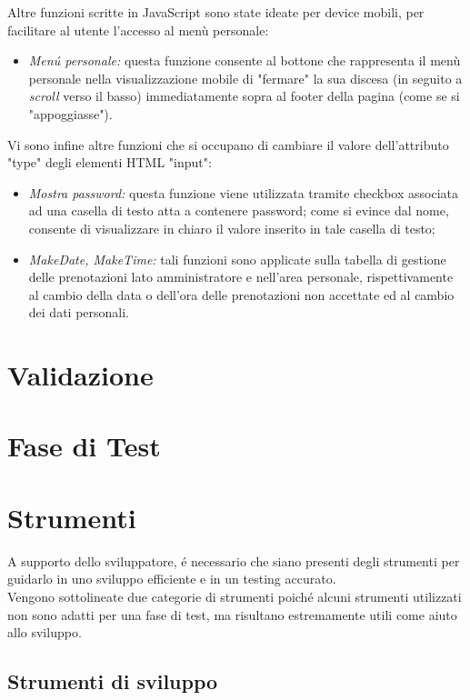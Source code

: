 \documentclass[]{article}
\begin{document}
Altre funzioni scritte in JavaScript sono state ideate per device mobili, per facilitare al utente l'accesso al menù personale:
\begin{itemize}
        \item \textit{Menú personale:} questa funzione consente al bottone che rappresenta il menù personale nella visualizzazione mobile di "fermare" la sua discesa (in seguito a \textit{scroll} verso il basso) immediatamente sopra al footer della pagina (come se si "appoggiasse").
\end{itemize}
Vi sono infine altre funzioni che si occupano di cambiare il valore dell'attributo "type" degli elementi HTML "input":
\begin{itemize}
        \item \textit{Mostra password:} questa funzione viene utilizzata tramite checkbox associata ad una casella di testo atta a contenere password; come si evince dal nome, consente di visualizzare in chiaro il valore inserito in tale casella di testo;
        \item \textit{MakeDate, MakeTime:} tali funzioni sono applicate sulla tabella di gestione delle prenotazioni lato amministratore e nell'area personale, rispettivamente al cambio della data o dell'ora delle prenotazioni non accettate ed al cambio dei dati personali.
\end{itemize}
 
\section{Validazione}

\section{Fase di Test}

\section{Strumenti}
A supporto dello sviluppatore, é necessario che siano presenti degli strumenti per guidarlo in uno sviluppo efficiente e in un testing accurato.\\
Vengono sottolineate due categorie di strumenti poiché alcuni strumenti utilizzati non sono adatti per una fase di test, ma risultano estremamente utili come aiuto allo sviluppo.
\subsection{Strumenti di sviluppo}
\end{document}
